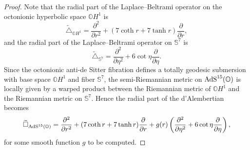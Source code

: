 \documentclass[10pt,a4paper]{amsart}
\numberwithin{equation}{section}
\begin{document}
\begin{proof}
Note that the radial part of the Laplace--Beltrami operator on the octonionic hyperbolic space $\mathbb{O}H^1$ is
\begin{equation*}%
\widetilde{\triangle}_{\mathbb{O}H^1}=\frac{{\partial}^2}{\partial {r}^2}+(7\coth r+7\tanh r)\frac{{\partial}}{\partial {r}},
\end{equation*}
and the radial part of the Laplace--Beltrami operator on $\mathbb{S}^{7}$ is
\begin{equation}\label{eq:LB_on_S^7}
\widetilde{\triangle}_{\mathbb{S}^7}=\frac{{\partial}^2}{\partial {\eta}^2}+6\cot \eta\frac{{\partial}}{\partial {\eta}}.
\end{equation}
Since the octonionic anti-de Sitter fibration defines a totally geodesic submersion with base space $\mathbb{O}H^1$ and fiber $\mathbb{S}^{7}$, the semi-Riemannian metric on ${\rm AdS}^{15}(\mathbb{O})$ is locally given by a warped product between the Riemannian metric of $\mathbb{O}H^1$ and the Riemannian metric on $\mathbb{S}^{7}$. Hence the radial part of the d'Alembertian becomes
\begin{equation}\label{radial 1}
\widetilde{\square}_{{\rm AdS}^{15}(\mathbb{O})}=\frac{{\partial}^2}{\partial {r}^2}+(7\coth r+7\tanh r)\frac{{\partial}}{\partial {r}} +g(r) \left(\frac{{\partial}^2}{\partial {\eta}^2}+6\cot \eta\frac{{\partial}}{\partial {\eta}} \right),
\end{equation}
for some smooth function $g$ to be computed.


\end{proof}
\end{document}
